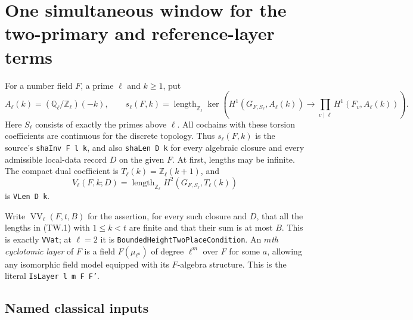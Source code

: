 \section{One simultaneous window for the two-primary and reference-layer terms}
\label{sec:simultaneous-cohomological-windows}


For a number field $F$, a prime $\ell$ and $k\ge1$, put
\[
 A_\ell(k)=(\mathbb Q_\ell/\mathbb Z_\ell)(-k),\qquad
 s_\ell(F,k)=\operatorname{length}_{\mathbb Z_\ell}
 \ker\!\left(H^1(G_{F,S_\ell},A_\ell(k))
       \longrightarrow\prod_{v\mid\ell}H^1(F_v,A_\ell(k))\right).
 \tag{TW.1}
\]
Here $S_\ell$ consists of exactly the primes above $\ell$.
All cochains with these torsion coefficients are continuous for the
discrete topology.  Thus $s_\ell(F,k)$ is the source's
\texttt{shaInv F l k}, and also \texttt{shaLen D k} for every
algebraic closure and every admissible local-data record $D$ on the
given $F$.  At first, lengths may be infinite.  The compact dual
coefficient is $T_\ell(k)=\mathbb Z_\ell(k+1)$, and
\[
 V_\ell(F,k;D)=
 \operatorname{length}_{\mathbb Z_\ell}H^2(G_{F,S_\ell},T_\ell(k))
 \tag{TW.2}
\]
is \texttt{VLen D k}.

Write $\operatorname{VV}_\ell(F,t,B)$ for the assertion, for every
such closure and $D$, that all the lengths in (TW.1) with
$1\le k<t$ are finite and that their sum is at most $B$.
This is exactly \texttt{VVat}; at $\ell=2$ it is
\texttt{BoundedHeightTwoPlaceCondition}.
An \emph{$m$th cyclotomic layer} of $F$ is a field
$F(\mu_{\ell^a})$ of degree $\ell^m$ over $F$ for some $a$,
allowing any isomorphic field model equipped with its $F$-algebra
structure.  This is the literal \texttt{IsLayer l m F F'}.

\subsection{Named classical inputs}

